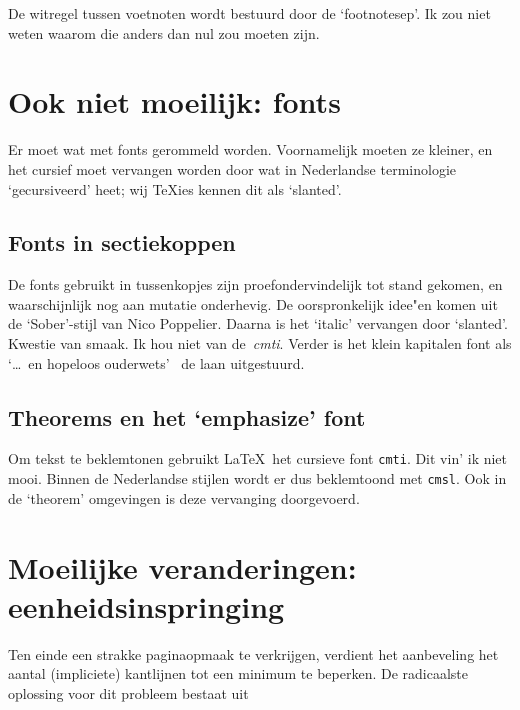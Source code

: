\documentclass[a4paper]{artikel1} %
\begin{document}
De witregel tussen voetnoten wordt bestuurd door de `footnotesep'. Ik
zou niet weten waarom die anders dan nul zou moeten zijn.
 
 
\section{Ook niet moeilijk: fonts}
 
Er moet wat met fonts gerommeld worden. Voornamelijk moeten ze
kleiner, en het cursief moet vervangen worden door wat in Nederlandse
terminologie `gecursiveerd' heet; wij \TeX ies kennen dit als
`slanted'.
 
\subsection{Fonts in sectiekoppen}
 
De fonts gebruikt in tussenkopjes zijn proefondervindelijk tot stand
gekomen, en waarschijnlijk nog aan mutatie onderhevig. De
oorspronkelijk idee"en komen uit de `Sober'-stijl van Nico Poppelier.
Daarna is het `italic' vervangen door `slanted'. Kwestie van smaak.
Ik hou niet van de~\mbox{\emph{cmti}}.  Verder is het klein kapitalen
font als `\dots~en hopeloos ouderwets'~\cite{Inge} de laan
uitgestuurd.
 
\subsection{Theorems en het `emphasize' font}
 
Om tekst te beklemtonen gebruikt \LaTeX\ het cursieve font
\texttt{cmti}.  Dit vin' ik niet mooi. Binnen de Nederlandse stijlen
wordt er dus beklemtoond met \texttt{cmsl}.  Ook in de `theorem'
omgevingen is deze vervanging doorgevoerd.
 
 
\section{Moeilijke veranderingen: eenheidsinspringing}
 
Ten einde een strakke paginaopmaak te verkrijgen, verdient het
aanbeveling het aantal (impliciete) kantlijnen tot een minimum te
beperken.  De radicaalste oplossing voor dit probleem bestaat uit
 
\end{document}
